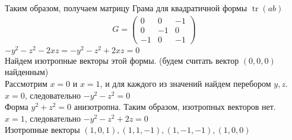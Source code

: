 Таким образом, получаем матрицу Грама для квадратичной формы $\operatorname{tr}(ab)$
\begin{gather*}
	G = 
	\begin{pmatrix}
		0 & 0 & -1 \\
		0 & -1 & 0 \\
		-1 & 0 & -1
	\end{pmatrix}
\end{gather*}
$-y^2-z^2-2xz=-y^2-z^2+2xz = 0$\\ 
Найдем изотропные векторы этой формы. (будем считать вектор $(0, 0, 0)$ найденным) \\
Рассмотрим  $x=0$ и $x=1$, и для каждого из значений найдем перебором $y, z$.\\
$x=0$, следовательно $-y^2-z^2=0$ \\
Форма $y^2+z^2=0$ анизотропна. Таким образом, изотропных векторов нет.\\
$x=1$, следовательно $-y^2-z^2+2z=0$ \\
Изотропные векторы $(1, 0, 1), (1, 1, -1), (1, -1, -1), (1, 0, 0)$
		